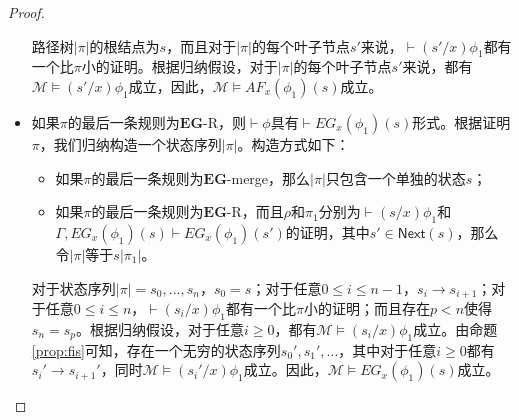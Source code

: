 \begin{proof}
\begin{itemize}
		路径树$|\pi|$的根结点为$s$，而且对于$|\pi|$的每个叶子节点$s'$来说，$\vdash (s'/x)\phi_1$都有一个比$\pi$小的证明。根据归纳假设，对于$|\pi|$的每个叶子节点$s'$来说，都有$\mathcal{M}\models (s'/x)\phi_1$成立，因此，$\mathcal{M}\models AF_x(\phi_1)(s)$成立。
		
		
		
		\item 如果$\pi$的最后一条规则为$\mathbf{EG}$-\textsf{R}，则$\vdash \phi$具有$\vdash EG_x(\phi_1)(s)$形式。根据证明$\pi$，我们归纳构造一个状态序列$|\pi|$。构造方式如下：
		\begin{itemize}
			
			\item 如果$\pi$的最后一条规则为$\mathbf{EG}$-merge，那么$|\pi|$只包含一个单独的状态$s$；
			
			
			\item 如果$\pi$的最后一条规则为$\mathbf{EG}$-\textsf{R}，而且$\rho$和$\pi_1$分别为$\vdash(s/x)\phi_1$和$\Gamma,EG_x(\phi_1)(s)\vdash EG_x(\phi_1)(s')$的证明，其中$s'\in\mathsf{Next}(s)$，那么令$|\pi|$等于$s|\pi_1|$。
		\end{itemize}
		
		对于状态序列$|\pi|=s_0,...,s_n$，$s_0=s$；对于任意$0\le i\le n-1$，$s_i\longrightarrow s_{i+1}$；对于任意$0\le i\le n$，$\vdash(s_i/x)\phi_1$都有一个比$\pi$小的证明；而且存在$p<n$使得$s_n=s_p$。根据归纳假设，对于任意$i\ge 0$，都有$\mathcal{M}\models (s_i/x)\phi_1$成立。由命题\ref{prop:fis}可知，存在一个无穷的状态序列$s_0',s_1',...$，其中对于任意$i\ge 0$都有$s_i'\longrightarrow s_{i+1}'$，同时$\mathcal{M}\models (s_i'/x)\phi_1$成立。因此，$\mathcal{M}\models EG_x(\phi_1)(s)$成立。
		

\end{itemize}
\end{proof}
